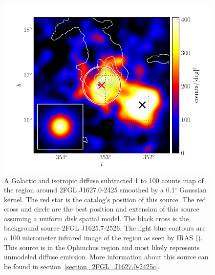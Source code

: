 \documentclass[12pt,preprint]{aastex}
\newcommand{\gev}{\text{GeV}\xspace}
\renewcommand{\deg}{\ensuremath{^\circ}\xspace}
\begin{document}
\begin{figure}
  \begin{center}
    \includegraphics[type=pdf,ext=.pdf,read=.pdf]{source_plots/source_1FGL_J1628.6-2419c}
  \end{center}
  \caption{
  A Galactic and isotropic diffuse subtracted 1 \gev to 100 \gev counts
  map of the region around 2FGL J1627.0-2425 smoothed by a 0.1\deg
  Gaussian kernel.  The red star is the catalog's position of
  this source.  The red cross and circle are
  the best position and extension of this source assuming a
  uniform disk spatial model.  The black cross is the background source
  2FGL J1625.7-2526.  The light blue contours are a 100 micrometer infrared
  image of the region as seen by IRAS (\cite{iras_rho_ophiuci}). This
  source is in the Ophiuchus region and most likely represents 
  unmodeled diffuse emission.  More information about this source can be found
  in section~\ref{section_2FGL_J1627.0-2425c}.
  }\label{1FGL_J1628.6-2419c}
\end{figure}
\end{document}
